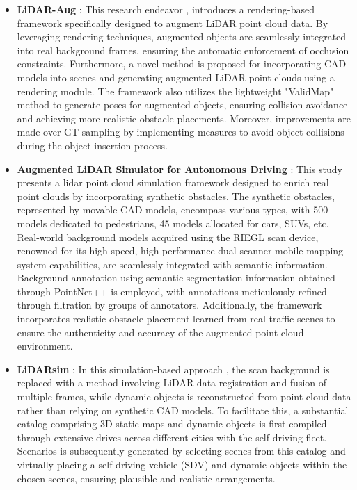 \begin{itemize}
    \item \textbf{LiDAR-Aug} : This research endeavor \parencite{lidar_aug}, introduces a rendering-based framework specifically designed to augment LiDAR point cloud data. By leveraging rendering techniques, augmented objects are seamlessly integrated into real background frames, ensuring the automatic enforcement of occlusion constraints. Furthermore, a novel method is proposed for incorporating CAD models into scenes and generating augmented LiDAR point clouds using a rendering module. The framework also utilizes the lightweight "ValidMap" method to generate poses for augmented objects, ensuring collision avoidance and achieving more realistic obstacle placements. Moreover, improvements are made over GT sampling by implementing measures to avoid object collisions during the object insertion process.
    \item \textbf{Augmented LiDAR Simulator for Autonomous Driving} : This study \parencite{aug_lidar_sim_2020} presents a lidar point cloud simulation framework  designed to enrich real point clouds by incorporating synthetic obstacles. The synthetic obstacles, represented by movable CAD models, encompass various types, with 500 models dedicated to pedestrians, 45 models allocated for cars, SUVs, etc. Real-world background models acquired using the RIEGL scan device, renowned for its high-speed, high-performance dual scanner mobile mapping system capabilities, are seamlessly integrated with semantic information. Background annotation using semantic segmentation information obtained through PointNet++ \parencite{pointnetplus2017} is employed, with annotations meticulously refined through filtration by groups of annotators. Additionally, the framework incorporates realistic obstacle placement learned from real traffic scenes to ensure the authenticity and accuracy of the augmented point cloud environment.
    \item \textbf{LiDARsim} : In this simulation-based approach \parencite{lidarsim2020}, the scan background is replaced with a method involving LiDAR data registration and fusion of multiple frames, while dynamic objects is reconstructed from point cloud data rather than relying on synthetic CAD models. To facilitate this, a substantial catalog comprising 3D static maps and dynamic objects is first compiled through extensive drives across different cities with the self-driving fleet. Scenarios is subsequently generated by selecting scenes from this catalog and virtually placing a self-driving vehicle (SDV) and dynamic objects within the chosen scenes, ensuring plausible and realistic arrangements.

\end{itemize}
